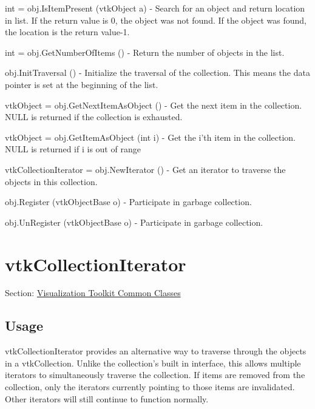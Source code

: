 \begin{DoxyItemize}
\item {\ttfamily int = obj.\-Is\-Item\-Present (vtk\-Object a)} -\/ Search for an object and return location in list. If the return value is 0, the object was not found. If the object was found, the location is the return value-\/1.  
\item {\ttfamily int = obj.\-Get\-Number\-Of\-Items ()} -\/ Return the number of objects in the list.  
\item {\ttfamily obj.\-Init\-Traversal ()} -\/ Initialize the traversal of the collection. This means the data pointer is set at the beginning of the list.  
\item {\ttfamily vtk\-Object = obj.\-Get\-Next\-Item\-As\-Object ()} -\/ Get the next item in the collection. N\-U\-L\-L is returned if the collection is exhausted.  
\item {\ttfamily vtk\-Object = obj.\-Get\-Item\-As\-Object (int i)} -\/ Get the i'th item in the collection. N\-U\-L\-L is returned if i is out of range  
\item {\ttfamily vtk\-Collection\-Iterator = obj.\-New\-Iterator ()} -\/ Get an iterator to traverse the objects in this collection.  
\item {\ttfamily obj.\-Register (vtk\-Object\-Base o)} -\/ Participate in garbage collection.  
\item {\ttfamily obj.\-Un\-Register (vtk\-Object\-Base o)} -\/ Participate in garbage collection.  
\end{DoxyItemize}\hypertarget{vtkcommon_vtkcollectioniterator}{}\section{vtk\-Collection\-Iterator}\label{vtkcommon_vtkcollectioniterator}
Section\-: \hyperlink{sec_vtkcommon}{Visualization Toolkit Common Classes} \hypertarget{vtkwidgets_vtkxyplotwidget_Usage}{}\subsection{Usage}\label{vtkwidgets_vtkxyplotwidget_Usage}
vtk\-Collection\-Iterator provides an alternative way to traverse through the objects in a vtk\-Collection. Unlike the collection's built in interface, this allows multiple iterators to simultaneously traverse the collection. If items are removed from the collection, only the iterators currently pointing to those items are invalidated. Other iterators will still continue to function normally.

